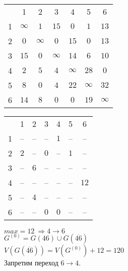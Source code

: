 \begin{table}[H]
\begin{center}
	\def\tabcolsep{18pt}
	\def\arraystretch{1.5}
	\fontsize{13}{14}\selectfont
	\begin{tabular}{|c||c|c|c|c|c|c|}
		\hline 
	  	& 1 & 2 & 3 & 4 & 5 & 6 \\ 
		\hhline{|=#=|=|=|=|=|=|} 
		1 & $\infty$ & $1$ & $15$ & $0$ & $1$ & $13$ \\ 
		\hline 
		2 & $0$ & $\infty$ & $0$ & $15$ & $0$ & $13$ \\ 
		\hline 
		3 & $15$ & $0$ & $\infty$ & $14$ & $6$ & $10$ \\ 
		\hline 
		4 & $2$ & $5$ & $4$ & $\infty$ & $28$ & $0$ \\ 
		\hline 
		5 & $8$ & $0$ & $4$ & $22$ & $\infty$ & $32$ \\ 
		\hline 
		6 & $14$ & $8$ & $0$ & $0$ & $19$ & $\infty$ \\
		\hline
	\end{tabular}  
\end{center}
\end{table} 

\begin{table}[H]
\begin{center}
	\def\tabcolsep{18pt}
	\def\arraystretch{1.5}
	\fontsize{13}{14}\selectfont
	\begin{tabular}{|c||c|c|c|c|c|c|}
		\hline 
	  	& 1 & 2 & 3 & 4 & 5 & 6 \\ 
		\hhline{|=#=|=|=|=|=|=|} 
		1 & -- & -- & -- & $1$ & -- & -- \\ 
		\hline 
		2 & $2$ & -- & $0$ & -- & $1$ & -- \\ 
		\hline 
		3 & -- & $6$ & -- & -- & -- & -- \\ 
		\hline 
		4 & -- & -- & -- & -- & -- & \cellcolor{pink} $12$ \\ 
		\hline 
		5 & -- & $4$ & -- & -- & -- & -- \\ 
		\hline 
		6 & -- & -- & $0$ & $0$ & -- & -- \\
		\hline
	\end{tabular}  
\end{center}
\end{table} 

\noindent $max = 12\ \Rightarrow 4 \rightarrow 6$\\
$G^{(0)} = G(46) \cup G(\overline{46})$\\
$V(G(\overline{46})) = V(G^{(0)}) + 12 = 120$\\
Запретим переход $6 \rightarrow 4$.


